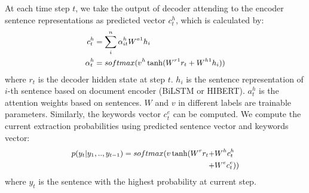 At each time step $t$, we take the output of decoder attending to the encoder sentence representations as predicted vector $c^h_t$, which is calculated by:
\begin{equation}
\small
\begin{aligned}
\small
c^h_t &= \sum_{i}^{n} {\alpha_{it}^h W^{a1} h_i} \\
\alpha_t^h &= softmax(v^h \tanh(W^{r1} r_t + W^{h1} h_i)) \\ 
\end{aligned}
\end{equation}
where $r_t$ is the decoder hidden state at step $t$.
$h_i$ is the sentence representation of $i$-th sentence
based on document encoder (BiLSTM or HIBERT).
$a_t^h$ is the attention weights based on sentences.
$W$ and $v$ in different labels are trainable parameters.
Similarly, the keywords vector $c_t^e$ can be computed.
We compute the current extraction probabilities
using predicted sentence vector and keywords vector:
\begin{equation}
\small
\begin{aligned}
p(y_t|y_1,..,y_{t-1}) = softmax(v \tanh(W^{r} r_{t}  +& W^{h} c_t^h  \\
                                                     +& W^{e} c_t^e))
\end{aligned}
\end{equation}
where $y_t$ is the sentence with the highest probability at current step.


